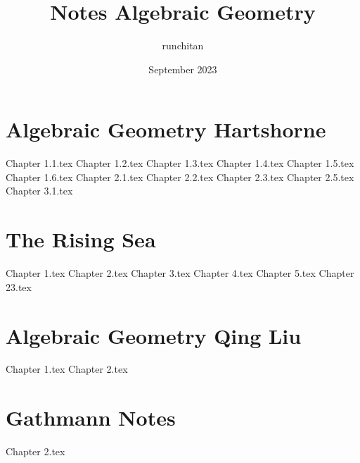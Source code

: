 \documentclass{article}
\title{Notes Algebraic Geometry}
\author{runchitan }
\date{September 2023}
\begin{document}

\tableofcontents

\newpage\part{Algebraic Geometry Hartshorne}
{Chapter 1.1.tex}
{Chapter 1.2.tex}
{Chapter 1.3.tex}
{Chapter 1.4.tex}
{Chapter 1.5.tex}
{Chapter 1.6.tex}
{Chapter 2.1.tex}
{Chapter 2.2.tex}
{Chapter 2.3.tex}
{Chapter 2.5.tex}
{Chapter 3.1.tex}

\newpage\part{The Rising Sea}
{Chapter 1.tex}
{Chapter 2.tex}
{Chapter 3.tex}
{Chapter 4.tex}
{Chapter 5.tex}
{Chapter 23.tex}

\newpage\part{Algebraic Geometry Qing Liu}
{Chapter 1.tex}
{Chapter 2.tex}

\newpage\part{Gathmann Notes}
{Chapter 2.tex}

\newpage


\end{document}
